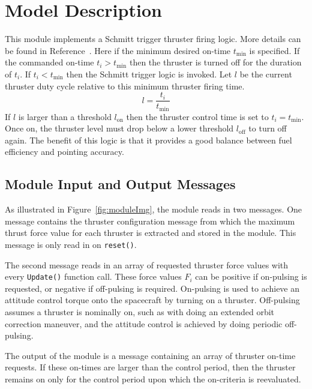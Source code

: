 


\section{Model Description}
This module implements a Schmitt trigger thruster firing logic.  More details can be found in Reference~.    Here if the minimum desired on-time $t_{\text{min}}$ is specified.  If the commanded on-time $t_{i}>t_{\text{min}}$ then the thruster is turned off for the duration of $t_{i}$.  If $t_{i}< t_{\text{min}}$ then the Schmitt trigger logic is invoked.  Let $l$ be the current thruster duty cycle relative to this minimum thruster firing time.
$$
	l = \frac{t_{i}}{t_{\text{min}}}
$$
If $l$ is larger than a threshold $l_{\text{on}}$ then the thruster control time is set to $t_{i} = t_{\text{min}}$.  Once on, the thruster level must drop below a lower threshold $l_{\text{off}}$ to turn off again.  The benefit of this logic is that it provides a good balance between fuel efficiency and pointing accuracy.


\subsection{Module Input and Output Messages}
As illustrated in Figure~\ref{fig:moduleImg}, the module reads in two messages.  One message contains the thruster configuration message from which the maximum thrust force value for each thruster is extracted and stored in the module.  This message is only read in on {\tt reset()}.

The second message reads in an array of requested thruster force values with every {\tt Update()} function call.  These force values $F_{i}$ can be positive if on-pulsing is requested, or negative if off-pulsing is required.  On-pulsing is used to achieve an attitude control torque onto the spacecraft by turning on a thruster.  Off-pulsing assumes a thruster is nominally on, such as with doing an extended orbit correction maneuver, and the attitude control is achieved by doing periodic off-pulsing.

The output of the module is a message containing an array of thruster on-time requests.  If these on-times are larger than the control period, then the thruster remains on only for the control period upon which the on-criteria is reevaluated.



